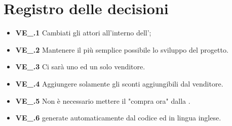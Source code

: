 \section{Registro delle decisioni}
\begin{itemize}
  \item \textbf{VE\_\Data.1} Cambiati gli attori all'interno dell'\textit{\AdR};
  \item \textbf{VE\_\Data.2} Mantenere il più semplice possibile lo sviluppo del progetto.
  \item \textbf{VE\_\Data.3} Ci sarà uno ed un solo venditore.
  \item \textbf{VE\_\Data.4} Aggiungere solamente gli sconti aggiungibili dal venditore.
  \item \textbf{VE\_\Data.5} Non è necessario mettere il "compra ora" dalla .
  \item \textbf{VE\_\Data.6}  generate automaticamente dal codice ed in lingua inglese.
\end{itemize}




